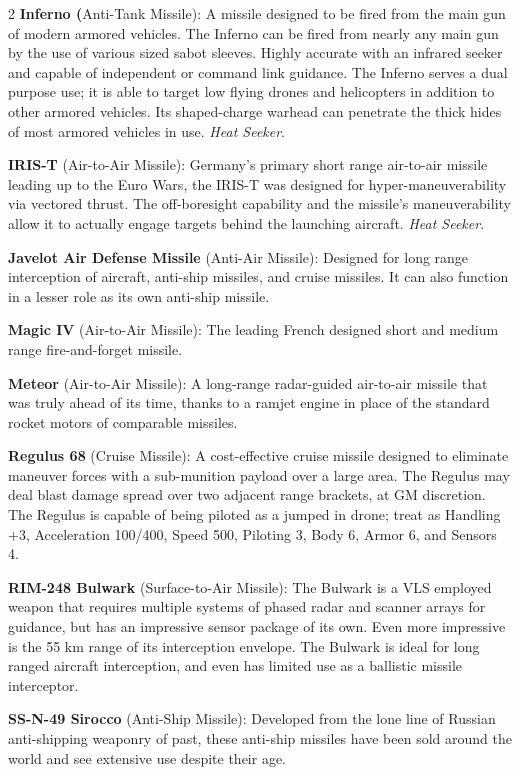 \documentclass[
  oneside]{article}
\begin{document}
\begin{multicols}{2}
\textbf{Inferno (}Anti-Tank Missile): A missile
designed to be fired from the main gun of modern
armored vehicles. The Inferno can be fired from
nearly any main gun by the use of various sized
sabot sleeves. Highly accurate with an infrared
seeker and capable of independent or command link
guidance. The Inferno serves a dual purpose use;
it is able to target low flying drones and
helicopters in addition to other armored vehicles.
Its shaped-charge warhead can penetrate the thick
hides of most armored vehicles in use. \emph{Heat
Seeker}.

\textbf{IRIS-T} (Air-to-Air Missile): Germany's
primary short range air-to-air missile leading up
to the Euro Wars, the IRIS-T was designed for
hyper-maneuverability via vectored thrust. The
off-boresight capability and the missile's
maneuverability allow it to actually engage
targets behind the launching aircraft. \emph{Heat
Seeker}.

\textbf{Javelot Air Defense Missile} (Anti-Air
Missile): Designed for long range interception of
aircraft, anti-ship missiles, and cruise missiles.
It can also function in a lesser role as its own
anti-ship missile.

\textbf{Magic IV} (Air-to-Air Missile): The
leading French designed short and medium range
fire-and-forget missile.

\textbf{Meteor} (Air-to-Air Missile): A long-range
radar-guided air-to-air missile that was truly
ahead of its time, thanks to a ramjet engine in
place of the standard rocket motors of comparable
missiles.

\textbf{Regulus 68} (Cruise Missile): A
cost-effective cruise missile designed to
eliminate maneuver forces with a sub-munition
payload over a large area. The Regulus may deal
blast damage spread over two adjacent range
brackets, at GM discretion. The Regulus is capable
of being piloted as a jumped in drone; treat as
Handling +3, Acceleration 100/400, Speed 500,
Piloting 3, Body 6, Armor 6, and Sensors 4.

\textbf{RIM-248 Bulwark} (Surface-to-Air Missile):
The Bulwark is a VLS employed weapon that requires
multiple systems of phased radar and scanner
arrays for guidance, but has an impressive sensor
package of its own. Even more impressive is the 55
km range of its interception envelope. The Bulwark
is ideal for long ranged aircraft interception,
and even has limited use as a ballistic missile
interceptor.

\textbf{SS-N-49 Sirocco} (Anti-Ship Missile):
Developed from the lone line of Russian
anti-shipping weaponry of past, these anti-ship
missiles have been sold around the world and see
extensive use despite their age.


\end{multicols}
\end{document}
